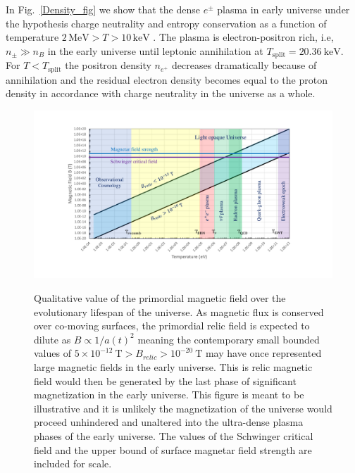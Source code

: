 \documentclass[Universe,article,submit,moreauthors,pdftex]{Definitions/mdpi}
\newcommand*{\rf}[1]{Fig.~{\ref{#1}}}
\begin{document}
In \rf{Density_fig} we show that the dense $e^{\pm}$ plasma in early universe under the hypothesis charge neutrality and entropy conservation as a function of temperature $2\,\mathrm{MeV}>T>10\,\mathrm{keV}$ \cite{Chris:2023abc}. The plasma is electron-positron rich, i.e, $n_{\pm}\gg n_B$ in the early universe until leptonic annihilation at $T_{\mathrm{split}} = 20.36\ \mathrm{keV}$. For $T<T_{\mathrm{split}}$ the positron density $n_{e^+}$ decreases dramatically because of annihilation and the residual electron density becomes equal to the proton density in accordance with charge neutrality in the universe as a whole.
\begin{figure}[htbp]
  \centering
  \includegraphics[trim=110 50 120 40,clip,width=\textwidth]{./plots/relic_plot.PDF}
  \label{relic_plot}
  \caption{Qualitative value of the primordial magnetic field over the evolutionary lifespan of the universe. As magnetic flux is conserved over co-moving surfaces, the primordial relic field is expected to dilute as $B\propto1/a(t)^{2}$ meaning the contemporary small bounded values of $5\times10^{-12}\ \mathrm{T}>B_{relic}>10^{-20}\ \mathrm{T}$ may have once represented large magnetic fields in the early universe. This is relic magnetic field would then be generated by the last phase of significant magnetization in the early universe. This figure is meant to be illustrative and it is unlikely the magnetization of the universe would proceed unhindered and unaltered into the ultra-dense plasma phases of the early universe. The values of the Schwinger critical field and the upper bound of surface magnetar field strength are included for scale.}
\end{figure}
\end{document}

